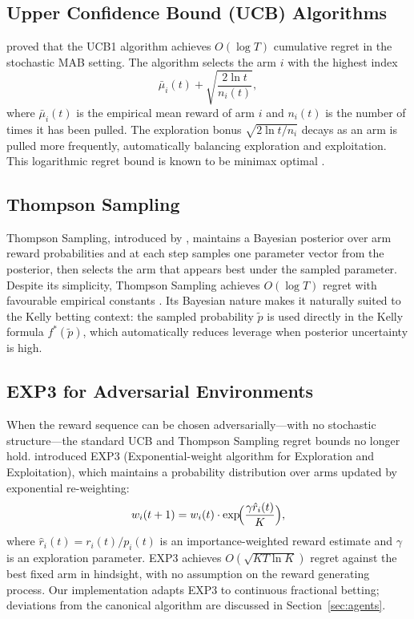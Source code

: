 \subsection{Upper Confidence Bound (UCB) Algorithms}

\textcite{auer2002finite} proved that the UCB1 algorithm achieves
$O(\log T)$ cumulative regret in the stochastic MAB setting. The algorithm
selects the arm $i$ with the highest index
\[
    \bar{\mu}_i(t) + \sqrt{\frac{2\ln t}{n_i(t)}},
\]
where $\bar{\mu}_i(t)$ is the empirical mean reward of arm $i$ and $n_i(t)$
is the number of times it has been pulled. The exploration bonus
$\sqrt{2\ln t / n_i}$ decays as an arm is pulled more frequently,
automatically balancing exploration and exploitation. This logarithmic regret
bound is known to be minimax optimal \parencite{lattimore2020bandit}.

\subsection{Thompson Sampling}

Thompson Sampling, introduced by \textcite{thompson1933likelihood}, maintains
a Bayesian posterior over arm reward probabilities and at each step samples
one parameter vector from the posterior, then selects the arm that appears
best under the sampled parameter. Despite its simplicity, Thompson Sampling
achieves $O(\log T)$ regret with favourable empirical constants
\parencite{agrawal2012analysis, russo2018tutorial}. Its Bayesian nature makes
it naturally suited to the Kelly betting context: the sampled probability
$\tilde{p}$ is used directly in the Kelly formula $f^*(\tilde{p})$, which
automatically reduces leverage when posterior uncertainty is high.

\subsection{EXP3 for Adversarial Environments}

When the reward sequence can be chosen adversarially---with no stochastic
structure---the standard UCB and Thompson Sampling regret bounds no longer
hold. \textcite{auer2002nonstochastic} introduced EXP3 (Exponential-weight
algorithm for Exploration and Exploitation), which maintains a probability
distribution over arms updated by exponential re-weighting:
\[
    w_i(t+1) = w_i(t) \cdot \exp\!\Bigl(\frac{\gamma \hat{r}_i(t)}{K}\Bigr),
\]
where $\hat{r}_i(t) = r_i(t)/p_i(t)$ is an importance-weighted reward
estimate and $\gamma$ is an exploration parameter. EXP3 achieves
$O(\sqrt{KT\ln K})$ regret against the best fixed arm in hindsight, with no
assumption on the reward generating process. Our implementation adapts EXP3
to continuous fractional betting; deviations from the canonical algorithm
are discussed in Section~\ref{sec:agents}.

